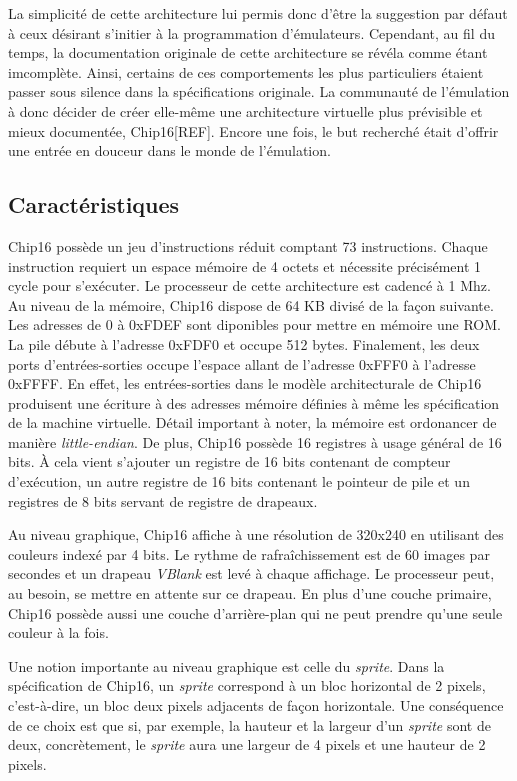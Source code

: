 \documentclass{article} %
\begin{document}
La simplicité de cette architecture lui permis donc d'être la suggestion par défaut à ceux désirant s'initier à la programmation d'émulateurs. Cependant, au fil du temps, la documentation originale de cette architecture se révéla comme étant imcomplète. Ainsi, certains de ces comportements les plus particuliers étaient passer sous silence dans la spécifications originale. La communauté de l'émulation à donc décider de créer elle-même une architecture virtuelle plus prévisible et mieux documentée, Chip16[REF]. Encore une fois, le but recherché était d'offrir une entrée en douceur dans le monde de l'émulation.

\subsection{Caractéristiques}
Chip16 possède un jeu d'instructions réduit comptant 73 instructions. Chaque instruction requiert un espace mémoire de 4 octets et nécessite précisément 1 cycle pour s'exécuter. Le processeur de cette architecture est cadencé à 1 Mhz. Au niveau de la mémoire, Chip16 dispose de 64 KB divisé de la façon suivante. Les adresses de 0 à 0xFDEF sont diponibles pour mettre en mémoire une ROM. La pile débute à l'adresse 0xFDF0 et occupe 512 bytes. Finalement, les deux ports d'entrées-sorties occupe l'espace allant de l'adresse 0xFFF0 à l'adresse 0xFFFF. En effet, les entrées-sorties dans le modèle architecturale de Chip16 produisent une écriture à des adresses mémoire définies à même les spécification de la machine virtuelle. Détail important à noter, la mémoire est ordonancer de manière \textit{little-endian}. De plus, Chip16 possède 16 registres à usage général de 16 bits. À cela vient s'ajouter un registre de 16 bits contenant de compteur d'exécution, un autre registre de 16 bits contenant le  pointeur de pile et un registres de 8 bits servant de registre de drapeaux. 

Au niveau graphique, Chip16 affiche à une résolution de 320x240 en utilisant des couleurs indexé par 4 bits. Le rythme de rafraîchissement est de 60 images par secondes et un drapeau \textit{VBlank} est levé à chaque affichage. Le processeur peut, au besoin, se mettre en attente sur ce drapeau. En plus d'une couche primaire, Chip16 possède aussi une couche d'arrière-plan qui ne peut prendre qu'une seule couleur à la fois. 

Une notion importante au niveau graphique est celle du \textit{sprite}. Dans la spécification de Chip16, un \textit{sprite} correspond à un bloc horizontal de 2 pixels, c'est-à-dire, un bloc deux pixels adjacents de façon horizontale. Une conséquence de ce choix est que si, par exemple, la hauteur et la largeur d'un \textit{sprite} sont de deux, concrètement, le \textit{sprite} aura une largeur de 4 pixels et une hauteur de 2 pixels.
\end{document}
